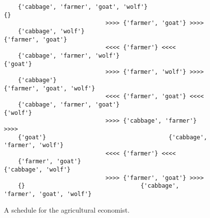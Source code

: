\begin{figure}[!ht]
  \centering
\begin{verbatim}
    {'cabbage', 'farmer', 'goat', 'wolf'}                                 {}
                             >>>> {'farmer', 'goat'} >>>> 
    {'cabbage', 'wolf'}                                   {'farmer', 'goat'}
                             <<<< {'farmer'} <<<< 
    {'cabbage', 'farmer', 'wolf'}                                   {'goat'}
                             >>>> {'farmer', 'wolf'} >>>> 
    {'cabbage'}                                   {'farmer', 'goat', 'wolf'}
                             <<<< {'farmer', 'goat'} <<<< 
    {'cabbage', 'farmer', 'goat'}                                   {'wolf'}
                             >>>> {'cabbage', 'farmer'} >>>> 
    {'goat'}                                   {'cabbage', 'farmer', 'wolf'}
                             <<<< {'farmer'} <<<< 
    {'farmer', 'goat'}                                   {'cabbage', 'wolf'}
                             >>>> {'farmer', 'goat'} >>>> 
    {}                                 {'cabbage', 'farmer', 'goat', 'wolf'}
\end{verbatim} 
\vspace*{-0.3cm}
\caption{A schedule for the agricultural economist.}  
\label{fig:wolf-ziege-solution}
\end{figure}

\vspace*{\fill}


